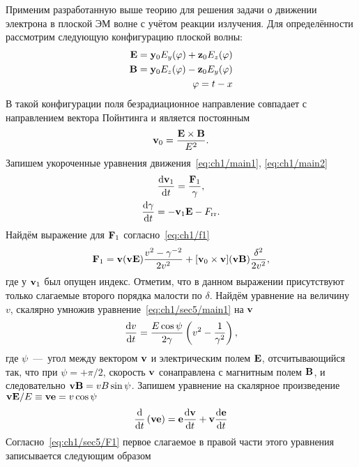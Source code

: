 Применим разработанную выше теорию для решения задачи о движении электрона в плоской ЭМ волне с учётом реакции излучения.
Для определённости рассмотрим следующую конфигурацию плоской волны:
\begin{align}
    \vb{E} = \vb{y}_0 E_y(\varphi) + \vb{z}_0 E_z(\varphi) \\
    \vb{B} = \vb{y}_0 E_z(\varphi) - \vb{z}_0 E_y(\varphi) \\
    \varphi = t - x
\end{align}
В такой конфигурации поля безрадиационное направление совпадает с направлением вектора Пойнтинга и является постоянным
\begin{equation}
    \vb{v}_0=\frac{\vb{E\times B}}{E^2}.
\end{equation}
Запишем укороченные уравнения движения~\eqref{eq:ch1/main1}, \eqref{eq:ch1/main2}
\begin{gather}
    \label{eq:ch1/sec5/main1}
    \dv{\vb{v}_1}{t} = \frac{\vb{F}_1}{\gamma} ,\\
    \label{eq:ch1/sec5/main2}
    \dv{\gamma}{t} = -\vb{v}_1\vb{E} - F_\mathrm{rr}.
\end{gather}
Найдём выражение для $\vb{F}_1$ согласно~\eqref{eq:ch1/f1}
\begin{align}
    \label{eq:ch1/sec5/F1}
    \vb{F}_1 = \vb{v} (\vb{v}\vb{E}) \frac{v^2 - \gamma^{-2}}{2v^2} + [\vb{v}_0\times\vb{v}] (\vb{v}\vb{B}) \frac{\delta^2}{2v^2},
\end{align}
где у $\vb{v}_1$ был опущен индекс.
Отметим, что в данном выражении присутствуют только слагаемые второго порядка малости по $\delta$.
Найдём уравнение на величину $v$, скалярно умножив уравнение~\eqref{eq:ch1/sec5/main1} на $\vb{v}$
\begin{equation}
    \label{eq:ch1/sec5/dvdt}
    \dv{v}{t} = \frac{E \cos\psi}{2 \gamma} \left( v^2 - \frac{1}{\gamma^2} \right),
\end{equation}
где $\psi$~---~угол между вектором $\vb{v}$ и электрическим полем $\vb{E}$, отсчитывающийся так, что при $\psi = +\pi/2$, скорость $\vb{v}$ сонаправлена с магнитным полем $\vb{B}$, и следовательно $\vb{v}\vb{B} = vB\sin\psi$.
Запишем уравнение на скалярное произведение $\vb{v}\vb{E}/E \equiv \vb{v}\vb{e} = v\cos\psi$
\begin{equation}
    \label{eq:ch1/sec5/ve}
    \dv{}{t}\left( \vb{v}\vb{e} \right) = \vb{e}\dv{\vb{v}}{t} + \vb{v}\dv{\vb{e}}{t}
\end{equation}
Согласно~\eqref{eq:ch1/sec5/F1} первое слагаемое в правой части этого уравнения записывается следующим образом
